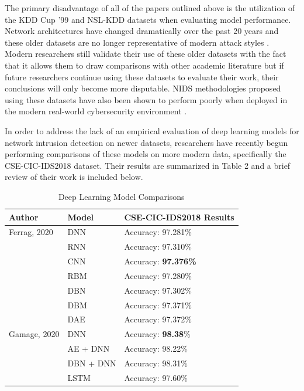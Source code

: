 \documentclass[conference]{IEEEtran}
\begin{document}
The primary disadvantage of all of the papers outlined above is the utilization of the KDD Cup '99 and NSL-KDD datasets when evaluating model performance. Network architectures have changed dramatically over the past 20 years and these older datasets are no longer representative of modern attack styles \cite{b4}. Modern researchers still validate their use of these older datasets with the fact that it allows them to draw comparisons with other academic literature \cite{b10} but if future researchers continue using these datasets to evaluate their work, their conclusions will only become more disputable. NIDS methodologies proposed using these datasets have also been shown to perform poorly when deployed in the modern real-world cybersecurity environment \cite{b12}.

In order to address the lack of an empirical evaluation of deep learning models for network intrusion detection on newer datasets, researchers have recently begun performing comparisons of these models on more modern data, specifically the CSE-CIC-IDS2018 dataset. Their results are summarized in Table 2 and a brief review of their work is included below.

\begin{table}[htbp]
\caption{Deep Learning Model Comparisons}
\begin{center}
\begin{tabular}{|p{1.7cm}|p{2cm}|p{3.5cm}|}
\hline
\textbf{Author} & \textbf{Model} & \textbf{CSE-CIC-IDS2018 Results}\\[2pt]
\hline
Ferrag, 2020 & DNN & Accuracy: 97.281\%\\[2pt]
 & RNN & Accuracy: 97.310\%\\[2pt]
 & CNN & Accuracy: \textbf{97.376\%}\\[2pt]
 & RBM & Accuracy: 97.280\%\\[2pt]
 & DBN & Accuracy: 97.302\%\\[2pt]
 & DBM & Accuracy: 97.371\%\\[2pt]
 & DAE & Accuracy: 97.372\%\\[2pt]
\hline 
Gamage, 2020 & DNN & Accuracy: \textbf{98.38}\%\\[2pt]
 & AE + DNN & Accuracy: 98.22\%\\[2pt]
 & DBN + DNN & Accuracy: 98.31\%\\[2pt]
 & LSTM & Accuracy: 97.60\%\\[2pt]
\hline
\end{tabular}
\label{tab1}
\end{center}
\end{table}
\end{document}
